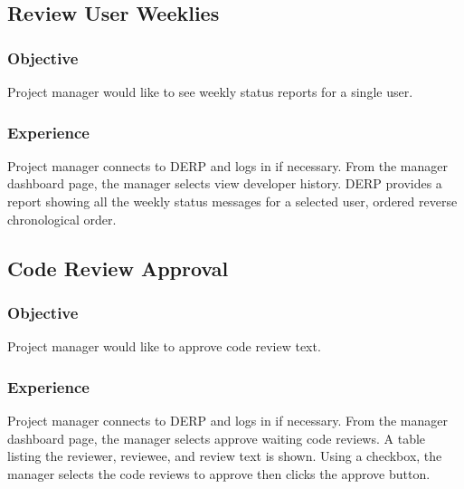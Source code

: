 \subsection*{Review User Weeklies}
\subsubsection*{Objective}
Project manager would like to see weekly status reports for a single user.
\subsubsection*{Experience}
Project manager connects to DERP and logs in if necessary. From the manager dashboard page, the manager selects view developer history. DERP provides a report showing all the weekly status messages for a selected user, ordered reverse chronological order. 


\subsection*{Code Review Approval}
\subsubsection*{Objective}
Project manager would like to approve code review text.
\subsubsection*{Experience}
Project manager connects to DERP and logs in if necessary. From the manager dashboard page, the manager selects approve waiting code reviews. A table listing the reviewer, reviewee, and review text is shown. Using a checkbox, the manager selects the code reviews to approve then clicks the approve button.